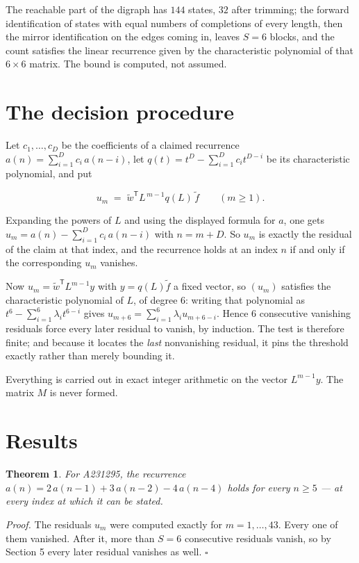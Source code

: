 \documentclass[11pt]{article}
\newtheorem{theorem}{Theorem}
\theoremstyle{definition}
\begin{document}
The reachable part of the digraph has $144$ states, $32$ after trimming; the forward identification of states with equal numbers of completions of every length, then the mirror identification on the edges coming in, leaves $S = 6$ blocks, and the count satisfies the linear recurrence given by the characteristic polynomial of that $6\times6$ matrix. The bound is computed, not assumed.

\section{The decision procedure}

Let $c_1,\dots,c_D$ be the coefficients of a claimed recurrence $a(n) = \sum_{i=1}^{D} c_i\,a(n-i)$, let $q(t) = t^{D} - \sum_{i=1}^{D} c_i t^{D-i}$ be its characteristic polynomial, and put

\[u_m \;=\; \tilde w^{\mathsf T} L^{\,m-1} q(L)\,\tilde f \qquad (m \ge 1).\]

Expanding the powers of $L$ and using the displayed formula for $a$, one gets $u_m = a(n) - \sum_{i=1}^{D} c_i\,a(n-i)$ with $n = m + D$. So $u_m$ is exactly the residual of the claim at that index, and the recurrence holds at an index $n$ if and only if the corresponding $u_m$ vanishes.

Now $u_m = \tilde w^{\mathsf T} L^{m-1} y$ with $y = q(L)\tilde f$ a fixed vector, so $(u_m)$ satisfies the characteristic polynomial of $L$, of degree $6$: writing that polynomial as $t^{6} - \sum_{i=1}^{6} \lambda_i t^{6-i}$ gives $u_{m+6} = \sum_{i=1}^{6} \lambda_i u_{m+6-i}$. Hence $6$ consecutive vanishing residuals force every later residual to vanish, by induction. The test is therefore finite; and because it locates the {\itshape last} nonvanishing residual, it pins the threshold exactly rather than merely bounding it.

Everything is carried out in exact integer arithmetic on the vector $L^{m-1}y$. The matrix $M$ is never formed.

\section{Results}

\begin{theorem} For A231295, the recurrence $a(n) = 2\,a(n-1) + 3\,a(n-2) - 4\,a(n-4)$ holds for every $n \ge 5$ --- at every index at which it can be stated.\end{theorem}

{\itshape Proof.} The residuals $u_m$ were computed exactly for $m = 1,\dots,43$. Every one of them vanished. After it, more than $S = 6$ consecutive residuals vanish, so by Section 5 every later residual vanishes as well. $\square$
\end{document}
